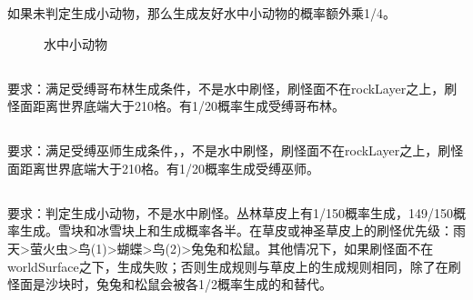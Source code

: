 如果未判定生成小动物，那么生成友好水中小动物的概率额外乘1/4。
\begin{figure}[h]
    \centering
    \caption{水中小动物}
\end{figure}

\subsection{}
要求：满足受缚哥布林生成条件，不是水中刷怪，刷怪面不在rockLayer之上，刷怪面距离世界底端大于210格。有1/20概率生成受缚哥布林。

\subsection{}
要求：满足受缚巫师生成条件，，不是水中刷怪，刷怪面不在rockLayer之上，刷怪面距离世界底端大于210格。有1/20概率生成受缚巫师。
\begin{figure}[h]
    \centering
    \caption{}
\end{figure}

\subsection{}
要求：判定生成小动物，不是水中刷怪。丛林草皮上有1/150概率生成，149/150概率生成。雪块和冰雪块上和生成概率各半。在草皮或神圣草皮上的刷怪优先级：雨天>萤火虫>鸟(1)>蝴蝶>鸟(2)>兔兔和松鼠。其他情况下，如果刷怪面不在worldSurface之下，生成失败；否则生成规则与草皮上的生成规则相同，除了在刷怪面是沙块时，兔兔和松鼠会被各1/2概率生成的和替代。

